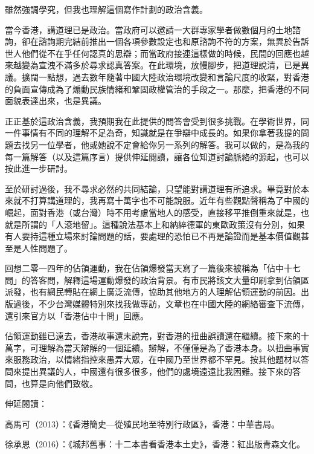 雖然強調學究，但我也理解這個寫作計劃的政治含義。

當今香港，講道理已是政治。當政府可以邀請一大群專家學者做數個月的土地諮詢，卻在諮詢期完結前推出一個各項參數設定也和原諮詢不符的方案，無異於告訴世人他們從不在乎任何認真的思辯；而當政府接連這樣做的時候，民間的回應也越來越變為宣洩不滿多於尋求認真答案。在此環境，放慢腳步，把道理說清，已是異議。擴闊一點想，過去數年隨著中國大陸政治環境改變和言論尺度的收緊，對香港的負面宣傳成為了煽動民族情緒和鞏固政權管治的手段之一。那麼，把香港的不同面貌表達出來，也是異議。

正正基於這政治含義，我預期我在此提供的問答會受到很多挑戰。在學術世界，同一件事情有不同的理解不足為奇，知識就是在爭辯中成長的。如果你拿著我提的問題去找另一位學者，他或她說不定會給你另一系列的解答。我可以做的，是為我的每一篇解答（以及這篇序言）提供伸延閱讀，讓各位知道討論脈絡的源起，也可以按此進一步研討。

至於研討過後，我不尋求必然的共同結論，只望能對講道理有所追求。畢竟對於本來就不打算講道理的，我再寫十萬字也不可能說服。近年有些觀點聲稱為了中國的崛起，面對香港（或台灣）時不用考慮當地人的感受，直接移平推倒重來就是，也就是所謂的「人滾地留」。這種說法基本上和納綷德軍的東歐政策沒有分別，如果有人要持這種立場來討論問題的話，要處理的恐怕已不再是論證而是基本價值觀甚至是人性問題了。

回想二零一四年的佔領運動，我在佔領爆發當天寫了一篇後來被稱為「佔中十七問」的答客問，解釋這場運動爆發的政治背景。有市民將該文大量印刷拿到佔領區派發，也有網民轉貼在網上廣泛流傳，協助其他地方的人理解佔領運動的前因。出版過後，不少台灣媒體特別來找我做專訪，文章也在中國大陸的網絡審查下流傳，還引來官方以「香港佔中十問」回應。

佔領運動雖已遠去，香港故事還未說完，對香港的扭曲誤讀還在繼續。接下來的十萬字，可理解為當天辯解的一個延續。辯解，不僅僅是為了香港本身。以扭曲事實來服務政治，以情緒指控來愚弄大眾，在中國乃至世界都不罕見。按其他題材以答問來提出異議的人，中國還有很多很多，他們的處境遠遠比我困難。接下來的答問，也算是向他們致敬。

伸延閱讀：

高馬可（2013）：《香港簡史—從殖民地至特別行政區》，香港：中華書局。

徐承恩（2016）：《城邦舊事：十二本書看香港本土史》，香港：紅出版青森文化。